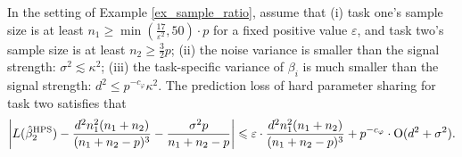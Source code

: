 \begin{example}
\begin{corollary}\label{cor_MTL_loss}
	In the setting of Example \ref{ex_sample_ratio}, assume that
	(i) task one's sample size is at least $n_1 \ge \min(\frac{17}{\varepsilon^2}, 50) \cdot p$ for a fixed positive value $\varepsilon$, and task two's sample size is at least $n_2 \ge \frac{3}{2}p$;
	(ii) the noise variance is smaller than the signal strength: $\sigma^2 \lesssim  \kappa^2$;
	(iii) the task-specific variance of $\beta_i$ is much smaller than the signal strength: $d^2 \le p^{-c_{\varphi}}{\kappa^2}$. 
	The prediction loss of hard parameter sharing for task two satisfies that
	\begin{align}\label{cor_MTL_error}
	  \left|L(\hat{\beta}_2^{\textup{HPS}}) - \frac{d^2 n_1^2 (n_1 + n_2)}{(n_1 + n_2 - p)^3} -\frac{\sigma^2 p}{n_1 + n_2 - p}  \right| \leqslant \varepsilon \cdot \frac{d^2 n_1^2 (n_1 + n_2)}{(n_1 + n_2 - p)^3} + p^{-c_{\varphi}} \cdot \operatorname{O}(d^2 + \sigma^2).
	 \end{align}
\end{corollary}




\end{example}
